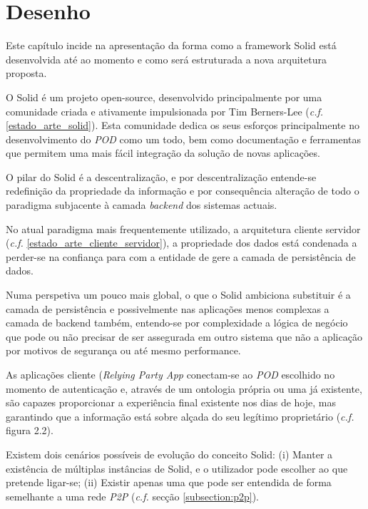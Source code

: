 
\chapter{Desenho \label{desenho}}
\label{cap:4}

Este capítulo incide na apresentação da forma como a framework Solid está desenvolvida até ao momento e como será estruturada a nova arquitetura proposta.

O Solid é um projeto open-source, desenvolvido principalmente por uma comunidade criada e ativamente impulsionada por Tim Berners-Lee (\emph{c.f.} \ref{estado_arte_solid}). Esta comunidade dedica os seus esforços principalmente no desenvolvimento do \emph{\acrshort{POD}} como um todo, bem como documentação e ferramentas que permitem uma mais fácil integração da solução de novas aplicações.

O pilar do Solid é a descentralização, e por descentralização entende-se redefinição da propriedade da informação e por consequência alteração de todo o paradigma subjacente à camada \emph{backend} dos sistemas actuais. 

No atual paradigma mais frequentemente utilizado, a arquitetura cliente servidor (\emph{c.f.} \ref{estado_arte_cliente_servidor}), a propriedade dos dados está condenada a perder-se na confiança para com a entidade de gere a camada de persistência de dados.

Numa perspetiva um pouco mais global, o que o Solid ambiciona substituir é a camada de persistência e possivelmente nas aplicações menos complexas a camada de backend também, entendo-se por complexidade a lógica de negócio que pode ou não precisar de ser assegurada em outro sistema que não a aplicação por motivos de segurança ou até mesmo performance.

As aplicações cliente (\emph{Relying Party App} conectam-se ao \emph{\acrshort{POD}} escolhido no momento de autenticação e, através de um ontologia própria ou uma já existente, são capazes proporcionar a experiência final existente nos dias de hoje, mas garantindo que a informação está sobre alçada do seu legítimo proprietário (\emph{c.f.} figura 2.2).

Existem dois cenários possíveis de evolução do conceito Solid: (i) Manter a existência de múltiplas instâncias de Solid, e o utilizador pode escolher ao que pretende ligar-se; (ii) Existir apenas uma que pode ser entendida de forma semelhante a uma rede \emph{P2P} (\emph{c.f.} secção \ref{subsection:p2p}).

